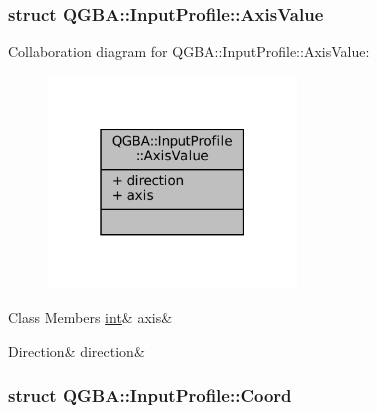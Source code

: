 \subsubsection{struct Q\+G\+BA\+:\+:Input\+Profile\+:\+:Axis\+Value}


Collaboration diagram for Q\+G\+BA\+:\+:Input\+Profile\+:\+:Axis\+Value\+:
\nopagebreak
\begin{figure}[H]
\begin{center}
\leavevmode
\includegraphics[width=187pt]{struct_q_g_b_a_1_1_input_profile_1_1_axis_value__coll__graph}
\end{center}
\end{figure}
\begin{DoxyFields}{Class Members}
\mbox{\label{class_q_g_b_a_1_1_input_profile_a9928dd27014448f73d131e1df0f2a88f}} 
\mbox{\hyperlink{ioapi_8h_a787fa3cf048117ba7123753c1e74fcd6}{int}}&
axis&
\\
\hline

\mbox{\label{class_q_g_b_a_1_1_input_profile_a221aa0e9fe42be0b2a0800ca1482b8f2}} 
Direction&
direction&
\\
\hline

\end{DoxyFields}
\label{struct_q_g_b_a_1_1_input_profile_1_1_coord}
\subsubsection{struct Q\+G\+BA\+:\+:Input\+Profile\+:\+:Coord}


